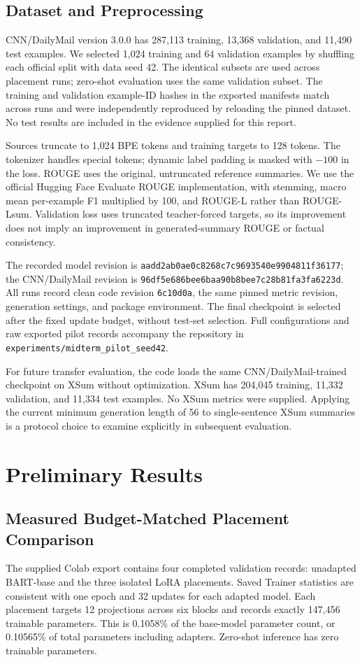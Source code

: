 \documentclass[11pt, letterpaper]{article}
\begin{document}
\subsection{Dataset and Preprocessing}
CNN/DailyMail version 3.0.0 has 287,113 training, 13,368 validation, and
11,490 test examples. We selected 1,024 training and 64 validation examples
by shuffling each official split with data seed 42. The identical subsets are
used across placement runs; zero-shot evaluation uses the same validation subset.
The training and validation example-ID hashes in the exported manifests match
across runs and were independently reproduced by reloading the pinned dataset.
No test results are included in the evidence supplied for this report.

Sources truncate to 1,024 BPE tokens and training targets to 128 tokens.
The tokenizer handles special tokens; dynamic label padding is masked with
$-100$ in the loss. ROUGE uses the original, untruncated reference summaries.
We use the official Hugging Face Evaluate ROUGE implementation, with stemming,
macro mean per-example F1 multiplied by 100, and ROUGE-L rather than ROUGE-Lsum.
Validation loss uses truncated teacher-forced targets, so its improvement does
not imply an improvement in generated-summary ROUGE or factual consistency.

The recorded model revision is
\nolinkurl{aadd2ab0ae0c8268c7c9693540e9904811f36177}; the CNN/DailyMail revision is
\nolinkurl{96df5e686bee6baa90b8bee7c28b81fa3fa6223d}. All runs record clean code
revision \texttt{6c10d0a}, the same pinned metric revision, generation settings,
and package environment. The final checkpoint is selected after the fixed update
budget, without test-set selection. Full configurations and raw exported pilot
records accompany the repository in \texttt{experiments/midterm\_pilot\_seed42}.

For future transfer evaluation, the code loads the same CNN/DailyMail-trained
checkpoint on XSum without optimization. XSum has 204,045 training, 11,332
validation, and 11,334 test examples. No XSum metrics were supplied. Applying
the current minimum generation length of 56 to single-sentence XSum summaries
is a protocol choice to examine explicitly in subsequent evaluation.

\section{Preliminary Results}
\subsection{Measured Budget-Matched Placement Comparison}
The supplied Colab export contains four completed validation records:
unadapted BART-base and the three isolated LoRA placements. Saved Trainer
statistics are consistent with one epoch and 32 updates for each adapted model.
Each placement targets 12 projections across six blocks and records exactly
147,456 trainable parameters. This is 0.1058\% of the base-model parameter
count, or 0.10565\% of total parameters including adapters. Zero-shot inference
has zero trainable parameters.
\end{document}

